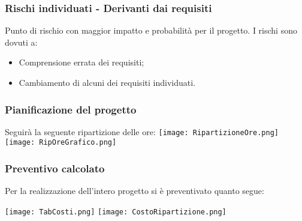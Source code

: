 \begin{frame}
  \frametitle{Rischi individuati - Derivanti dai requisiti}
    Punto di rischio con maggior impatto e probabilità per il progetto.
    I rischi sono dovuti a:
    \begin{itemize}
    \item Comprensione errata dei requisiti;
    \item Cambiamento di alcuni dei requisiti individuati.
    \end{itemize}    
\end{frame}

\begin{frame}
  \frametitle{Pianificazione del progetto}
  Seguirà la seguente ripartizione delle ore:
  \texttt{[image: RipartizioneOre.png]}
  \texttt{[image: RipOreGrafico.png]}

\end{frame}

\begin{frame}
  \frametitle{Preventivo calcolato}
  Per la realizzazione dell'intero progetto si è preventivato quanto segue:

  \texttt{[image: TabCosti.png]}
  \texttt{[image: CostoRipartizione.png]}
\end{frame}


